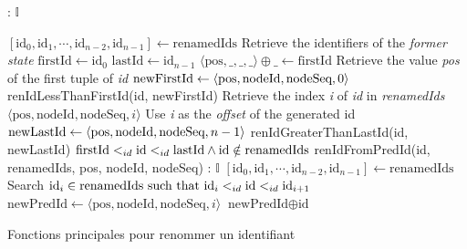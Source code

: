 \begin{algorithm}[!ht]
  \footnotesize
  \begin{algorithmic}[1]
       {: $\mathbb{I}$}

          \Statex
          \State $[\text{id}_0, \text{id}_1, \cdots, \text{id}_{n-2}, \text{id}_{n-1}] \gets \text{renamedIds}$
          \Comment Retrieve the identifiers of the \emph{former state}
          \State $\text{firstId} \gets \text{id}_0$
          \State $\text{lastId} \gets \text{id}_{n - 1}$
          \State $\langle \text{pos}, \_, \_, \_ \rangle \oplus \_ \gets \text{firstId}$
          \Comment Retrieve the value \emph{pos} of the first tuple of \emph{id}
          \Statex
              \State $\text{newFirstId} \gets \langle \text{pos},\text{nodeId},\text{nodeSeq},0 \rangle$
              \State \Return renIdLessThanFirstId(id, newFirstId)
              \label{alg:renameId-id-in-renamedids-begin}
              \State Retrieve the index \emph{i} of \emph{id} in \emph{renamedIds}
              \State \Return $\langle \text{pos}, \text{nodeId}, \text{nodeSeq}, i \rangle$ \label{alg:renameId-id-in-renamedids-end}
              \Comment Use \emph{i} as the \emph{offset} of the generated id
              \State $\text{newLastId} \gets \langle \text{pos},\text{nodeId},\text{nodeSeq},n-1 \rangle$
              \State \Return renIdGreaterThanLastId(id, newLastId)
          \Else
                \label{alg:renameId-main-case}
              \Statex \Comment $\text{firstId} <_{id} \text{id} <_{id} \text{lastId} \land \text{id} \notin \text{renamedIds}$
              \State \Return renIdFromPredId(id, renamedIds, pos, nodeId, nodeSeq)
          \EndIf
      \EndFunction
      \Statex
       {: $\mathbb{I}$}
          \Statex
          \State $[\text{id}_0, \text{id}_1, \cdots, \text{id}_{n-2}, \text{id}_{n-1}] \gets \text{renamedIds}$
          \State Search $\text{id}_i \in \text{renamedIds such that id}_i <_{id} \text{id} <_{id} \text{id}_{i+1}$ \label{alg:renameId-find-predecessor}
          \State $\text{newPredId} \gets \langle \text{pos}, \text{nodeId}, \text{nodeSeq}, i \rangle$ \label{alg:renameId-rename-predecessor}
          \State \Return $\text{newPredId} \oplus \text{id}$ \label{alg:renameId-concat-predecessor}
      \EndFunction
  \end{algorithmic}
  \caption{Fonctions principales pour renommer un identifiant}
  \label{alg:renameId}
\end{algorithm}

